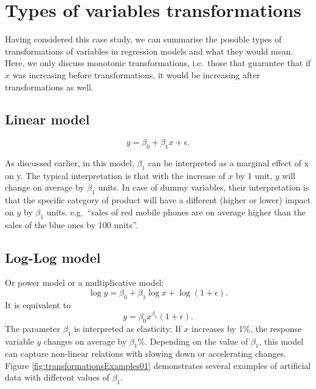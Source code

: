 \documentclass[
]{book}
\theoremstyle{definition}
\theoremstyle{definition}
\theoremstyle{definition}
\theoremstyle{definition}
\theoremstyle{remark}
\begin{document}
\hypertarget{types-of-variables-transformations}{%
\section{Types of variables transformations}\label{types-of-variables-transformations}}

Having considered this case study, we can summarise the possible types of transformations of variables in regression models and what they would mean. Here, we only discuss monotonic transformations, i.e.~those that guarantee that if \(x\) was increasing before transformations, it would be increasing after transformations as well.

\hypertarget{linear-model}{%
\subsection{Linear model}\label{linear-model}}

\begin{equation}
    y = \beta_0 + \beta_1 x + \epsilon .
    \label{eq:transformLinear}
\end{equation}

As discussed earlier, in this model, \(\beta_1\) can be interpreted as a marginal effect of x on y. The typical interpretation is that with the increase of \(x\) by 1 unit, \(y\) will change on average by \(\beta_1\) units. In case of dummy variables, their interpretation is that the specific category of product will have a different (higher or lower) impact on \(y\) by \(\beta_1\) units. e.g.~``sales of red mobile phones are on average higher than the sales of the blue ones by 100 units''.

\hypertarget{log-log-model}{%
\subsection{Log-Log model}\label{log-log-model}}

Or power model or a multiplicative model:
\begin{equation}
    \log y = \beta_0 + \beta_1 \log x + \log (1+\epsilon) .
    \label{eq:transformLogLog}
\end{equation}
It is equivalent to
\begin{equation}
    y = \beta_0 x^{\beta_1} (1+\epsilon) .
    \label{eq:transformMultiplicative}
\end{equation}
The parameter \(\beta_1\) is interpreted as elasticity: If \(x\) increases by 1\%, the response variable \(y\) changes on average by \(\beta_1\)\%. Depending on the value of \(\beta_1\), this model can capture non-linear relations with slowing down or accelerating changes. Figure \ref{fig:transformationsExamples01} demonstrates several examples of artificial data with different values of \(\beta_1\).
\end{document}
